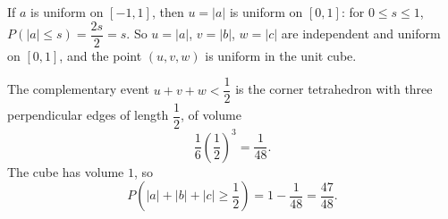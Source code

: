 If $a$ is uniform on $[-1,1]$, then $u=|a|$ is uniform on $[0,1]$: for $0\le s\le1$, $P(|a|\le s)=\dfrac{2s}{2}=s$. So $u=|a|$, $v=|b|$, $w=|c|$ are independent and uniform on $[0,1]$, and the point $(u,v,w)$ is uniform in the unit cube.

The complementary event $u+v+w<\dfrac{1}{2}$ is the corner tetrahedron with three perpendicular edges of length $\dfrac{1}{2}$, of volume
\[
\dfrac{1}{6}\left(\dfrac{1}{2}\right)^3=\dfrac{1}{48}.
\]
The cube has volume $1$, so
\[
P\left(|a|+|b|+|c|\ge\dfrac{1}{2}\right)=1-\dfrac{1}{48}=\boxed{\dfrac{47}{48}}.
\]
